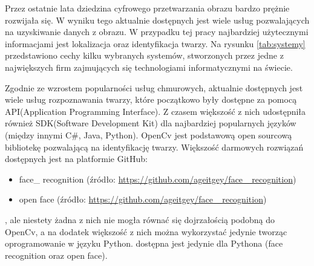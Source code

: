 Przez ostatnie lata dziedzina cyfrowego przetwarzania obrazu bardzo prężnie rozwijała się. W wyniku tego aktualnie dostępnych jest wiele usług pozwalających na uzyskiwanie danych z obrazu. W przypadku tej pracy najbardziej użytecznymi informacjami jest lokalizacja oraz identyfikacja twarzy.
Na rysunku \ref{tab:systemy} przedstawiono cechy kilku wybranych systemów, stworzonych przez jedne z największych firm zajmujących się technologiami informatycznymi na świecie.

\begin{table}[H]\label{tab:systemy}
	\centering
	\caption{Dostępne systemy przetwarzania obrazu}
\end{table}
Zgodnie ze wzrostem popularności usług chmurowych, aktualnie dostępnych jest wiele usług rozpoznawania twarzy, które początkowo były dostępne za pomocą API(Application Programming Interface). Z czasem większość z nich udostępniła również SDK(Software Development Kit) dla najbardziej popularnych języków (między innymi C\#, Java, Python). OpenCv jest podstawową open sourcową bibliotekę pozwalającą na identyfikację twarzy. Większość darmowych rozwiązań dostępnych jest na platformie GitHub:
\begin{itemize}
\item face\_ recognition (źródło: \href{https://github.com/ageitgey/face\_ recognition}{https://github.com/ageitgey/face\_ recognition})
\item open face (źródło: \href{https://github.com/cmusatyalab/openface}{https://github.com/ageitgey/face\_ recognition})
\end{itemize}
, ale niestety żadna z nich nie mogła równać się dojrzałością podobną do OpenCv, a na dodatek większość z nich
można wykorzystać jedynie tworząc oprogramowanie w języku Python.
 dostępna jest jedynie dla Pythona (face recognition oraz open face).

